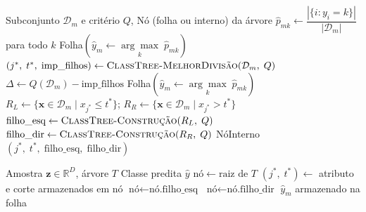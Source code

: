 \documentclass[12pt, a4paper]{article}
\theoremstyle{definition}
\theoremstyle{plain}
\theoremstyle{remark}
\begin{document}
\begin{algorithm}[H]
  \caption{ClassTree-Construção (Recursivo)}
  \begin{algorithmic}[1]
    \Require Subconjunto $\mathcal{D}_m$ e critério $Q$,
    \Ensure  Nó (folha ou interno) da árvore
    \State $\hat{p}_{mk} \gets \dfrac{|\{i : y_i = k\}|}{|\mathcal{D}_m|}$
           \quad para todo $k$
      \State \Return Folha$\!\left(\hat{y}_m \gets \underset{k}{\arg\max}\;\hat{p}_{mk}\right)$
    \EndIf
    \State $(j^*,\; t^*,\; \text{imp\_filhos}) \gets
           \textsc{ClassTree-MelhorDivisão}(\mathcal{D}_m,\; Q)$
    \State $\Delta \gets Q(\mathcal{D}_m) - \text{imp\_filhos}$
    \If{$\Delta < \epsilon$}
      \State \Return Folha$\!\left(\hat{y}_m \gets \underset{k}{\arg\max}\;\hat{p}_{mk}\right)$
    \EndIf
    \State $R_L \gets \{\mathbf{x} \in \mathcal{D}_m \mid x_{j^*} \leq t^*\}$;\;
           $R_R \gets \{\mathbf{x} \in \mathcal{D}_m \mid x_{j^*} > t^*\}$
    \State $\text{filho\_esq} \gets
           \textsc{ClassTree-Construção}(R_L,\; Q)$
    \State $\text{filho\_dir} \gets
           \textsc{ClassTree-Construção}(R_R,\; Q)$
    \State \Return NóInterno$(j^*,\; t^*,\; \text{filho\_esq},\; \text{filho\_dir})$
  \end{algorithmic}
\end{algorithm}

\begin{algorithm}[H]
  \caption{ClassTree-Predição}
  \begin{algorithmic}[1]
    \Require Amostra $\mathbf{z} \in \mathbb{R}^{D}$, árvore $T$
    \Ensure  Classe predita $\hat{y}$
    \State $\text{nó} \gets \text{raiz de } T$
      \State $(j^*,\; t^*) \gets$ atributo e corte armazenados em nó
        \State $\text{nó} \gets \text{nó.filho\_esq}$
      \Else
        \State $\text{nó} \gets \text{nó.filho\_dir}$
      \EndIf
    \EndWhile
    \State \Return $\hat{y}_m$ armazenado na folha
  \end{algorithmic}
\end{algorithm}

\end{document}
